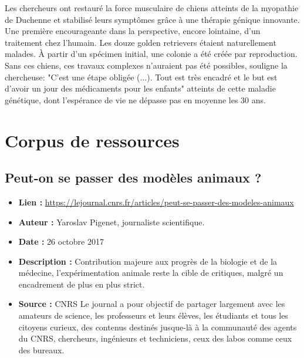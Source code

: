 \documentclass[10pt]{article}
\begin{document}
Les chercheurs ont restauré la force musculaire de chiens atteints de la myopathie de Duchenne et stabilisé leurs symptômes grâce à une thérapie génique innovante. Une première encourageante dans la perspective, encore lointaine, d'un traitement chez l'humain. Les douze golden retrievers étaient naturellement malades. À partir d'un spécimen initial, une colonie a été créée par reproduction. Sans ces chiens, ces travaux complexes n'auraient pas été possibles, souligne la chercheuse: "C'est une étape obligée (...). Tout est très encadré et le but est d'avoir un jour des médicaments pour les enfants" atteints de cette maladie génétique, dont l'espérance de vie ne dépasse pas en moyenne les 30 ans.\\


\newpage

\section{Corpus de ressources}

\subsection{Peut-on se passer des modèles animaux ?}

\begin{itemize}
	\item \textbf{Lien : }  \url{https://lejournal.cnrs.fr/articles/peut-se-passer-des-modeles-animaux} 
	\item \textbf{Auteur : } Yaroslav Pigenet, journaliste scientifique.
	\item \textbf{Date : } 26 octobre 2017
	\item \textbf{Description : } Contribution majeure aux progrès de la biologie et de la médecine, l’expérimentation animale reste la cible de critiques, malgré un encadrement de plus en plus strict.
	\item \textbf{Source : } CNRS Le journal a pour objectif de partager largement avec les amateurs de science, les professeurs et leurs élèves, les étudiants et tous les citoyens curieux, des contenus destinés jusque-là à la communauté des agents du CNRS, chercheurs, ingénieurs et techniciens, ceux des labos comme ceux des bureaux.
\end{itemize}
\end{document}
